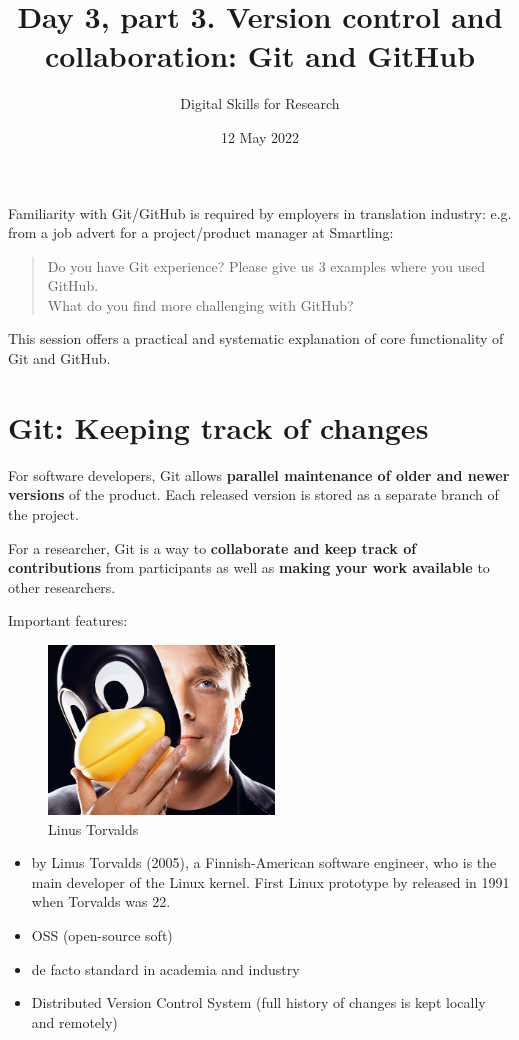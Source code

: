 \documentclass[a4paper,11pt]{article}
\title{Day 3, part 3. Version control and collaboration: Git and GitHub}
\author{Digital Skills for Research}
\date{12 May 2022}
\begin{document}
	
	\clearpage
	\maketitle
	\thispagestyle{empty}
	
	\tableofcontents 

\section*{}

Familiarity with Git/GitHub is required by employers in translation industry:
e.g. from a job advert for a project/product manager at Smartling:
\begin{quotation}
	\noindent Do you have Git experience? Please give us 3 examples where you used GitHub.\\
	What do you find more challenging with GitHub?
\end{quotation}

This session offers a practical and systematic explanation of core functionality of Git and GitHub. \\	

\section{Git: Keeping track of changes}

For software developers, Git allows \textbf{parallel maintenance of older and newer versions} of the product. Each released version is stored as a separate branch of the project. 

For a researcher, Git is a way to \textbf{collaborate and keep track of contributions} from participants as well as \textbf{making your work available} to other researchers. 

\bigskip

Important features:
\begin{figure}
	\centering
	\includegraphics[width=60mm]{pics/linux_git_creator_torvalds.jpg}
	\caption{Linus Torvalds}
\end{figure}
\begin{itemize}
	\item by Linus Torvalds (2005), a Finnish-American software engineer, who is the main developer of the Linux kernel. First Linux prototype by released in 1991 when Torvalds was 22.
	\item OSS (open-source soft)
	\item de facto standard in academia and industry
	\item Distributed Version Control System (full history of changes is kept locally and remotely)	
\end{itemize}
\end{document}
